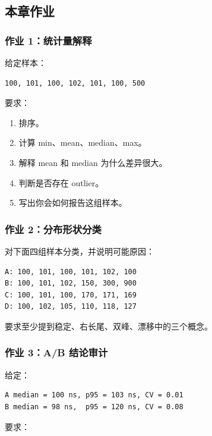 \subsection{本章作业}

\begin{exercisebox}
\subsubsection*{作业 1：统计量解释}

给定样本：

\begin{lstlisting}
100, 101, 100, 102, 101, 100, 500
\end{lstlisting}

要求：

\begin{enumerate}
  \item 排序。
  \item 计算 min、mean、median、max。
  \item 解释 mean 和 median 为什么差异很大。
  \item 判断是否存在 outlier。
  \item 写出你会如何报告这组样本。
\end{enumerate}

\subsubsection*{作业 2：分布形状分类}

对下面四组样本分类，并说明可能原因：

\begin{lstlisting}
A: 100, 101, 100, 101, 102, 100
B: 100, 101, 102, 150, 300, 900
C: 100, 101, 100, 170, 171, 169
D: 100, 102, 105, 110, 118, 127
\end{lstlisting}

要求至少提到稳定、右长尾、双峰、漂移中的三个概念。

\subsubsection*{作业 3：A/B 结论审计}

给定：

\begin{lstlisting}
A median = 100 ns, p95 = 103 ns, CV = 0.01
B median = 98 ns,  p95 = 120 ns, CV = 0.08
\end{lstlisting}

要求：


\end{exercisebox}
